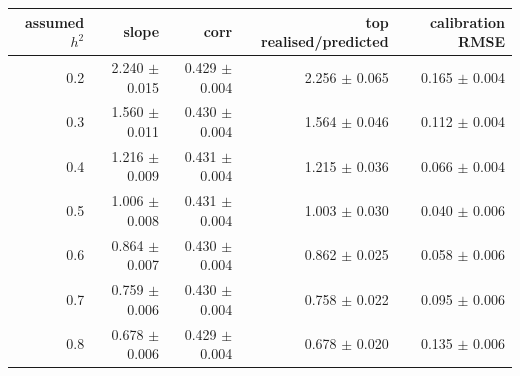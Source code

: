 \begin{tabular}{rrrrr}
\toprule
assumed $h^2$ & slope & corr & top realised/predicted & calibration RMSE \\
\midrule
0.2 & 2.240 $\pm$ 0.015 & 0.429 $\pm$ 0.004 & 2.256 $\pm$ 0.065 & 0.165 $\pm$ 0.004 \\
0.3 & 1.560 $\pm$ 0.011 & 0.430 $\pm$ 0.004 & 1.564 $\pm$ 0.046 & 0.112 $\pm$ 0.004 \\
0.4 & 1.216 $\pm$ 0.009 & 0.431 $\pm$ 0.004 & 1.215 $\pm$ 0.036 & 0.066 $\pm$ 0.004 \\
0.5 & 1.006 $\pm$ 0.008 & 0.431 $\pm$ 0.004 & 1.003 $\pm$ 0.030 & 0.040 $\pm$ 0.006 \\
0.6 & 0.864 $\pm$ 0.007 & 0.430 $\pm$ 0.004 & 0.862 $\pm$ 0.025 & 0.058 $\pm$ 0.006 \\
0.7 & 0.759 $\pm$ 0.006 & 0.430 $\pm$ 0.004 & 0.758 $\pm$ 0.022 & 0.095 $\pm$ 0.006 \\
0.8 & 0.678 $\pm$ 0.006 & 0.429 $\pm$ 0.004 & 0.678 $\pm$ 0.020 & 0.135 $\pm$ 0.006 \\
\bottomrule
\end{tabular}
